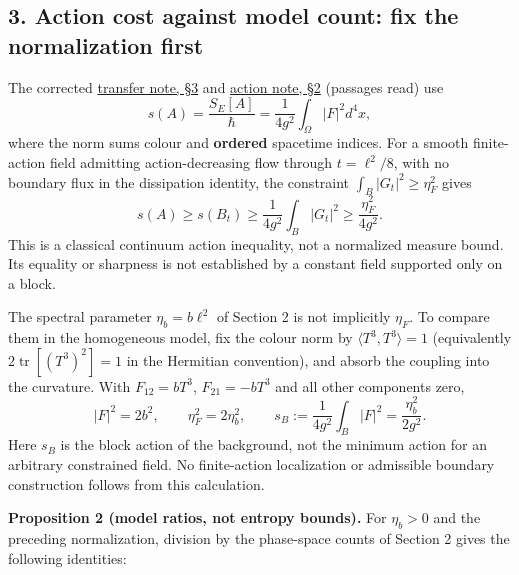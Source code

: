 \documentclass[11pt,a4paper]{article}
\begin{document}
\subsection{3. Action cost against model count: fix the normalization
first}\label{action-cost-against-model-count-fix-the-normalization-first}

The corrected
\href{ground-state-measure-transfer.md\#3-action-cost-at-a-block-scale-not-a-probability-theorem}{transfer
note, §3} and \href{large-field-action-lower-bound.md}{action note, §2}
(passages read) use
\[s(A)=\frac{S_E[A]}{\hbar}=\frac1{4g^2}\int_\Omega|F|^2d^4x,\] where
the norm sums colour and \textbf{ordered} spacetime indices. For a
smooth finite-action field admitting action-decreasing flow through
\(t=\ell^2/8\), with no boundary flux in the dissipation identity, the
constraint \(\int_B|G_t|^2\ge\eta_F^2\) gives
\[s(A)\ge s(B_t)\ge\frac1{4g^2}\int_B|G_t|^2
\ge\frac{\eta_F^2}{4g^2}.\] This is a classical continuum action
inequality, not a normalized measure bound. Its equality or sharpness is
not established by a constant field supported only on a block.

The spectral parameter \(\eta_b=b\ell^2\) of Section 2 is not implicitly
\(\eta_F\). To compare them in the homogeneous model, fix the colour
norm by \(\langle T^3,T^3\rangle=1\) (equivalently
\(2\operatorname{tr}[(T^3)^2]=1\) in the Hermitian convention), and
absorb the coupling into the curvature. With \(F_{12}=bT^3\),
\(F_{21}=-bT^3\) and all other components zero, \[|F|^2=2b^2,\qquad
\eta_F^2=2\eta_b^2,\qquad
s_B:=\frac1{4g^2}\int_B|F|^2
=\frac{\eta_b^2}{2g^2}.\] Here \(s_B\) is the block action of the
background, not the minimum action for an arbitrary constrained field.
No finite-action localization or admissible boundary construction
follows from this calculation.

\textbf{Proposition 2 (model ratios, not entropy bounds).} For
\(\eta_b>0\) and the preceding normalization, division by the
phase-space counts of Section 2 gives the following identities:
\end{document}
